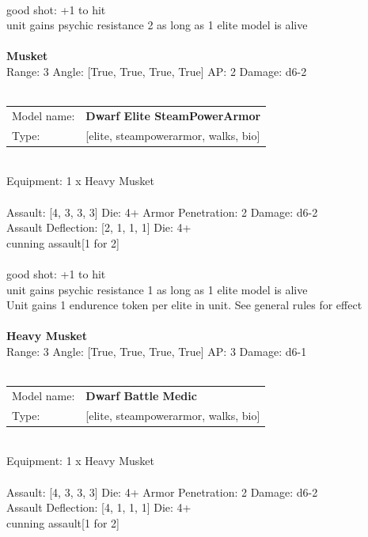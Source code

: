 \ \\
good shot: +1 to hit\\ 
unit gains psychic resistance 2 as long as 1 elite model is alive\\ 

\ \\
{\bf Musket } \\



Range: 3  Angle: [True, True, True, True] AP: 2 Damage: d6-2 \\




 
\ \\


\begin{tabular}{ll}
Model name: & {\bf Dwarf Elite SteamPowerArmor } \\
Type: & [elite, steampowerarmor, walks, bio] \\
\end{tabular}
\ \\
Equipment: 1 x Heavy Musket \\
\ \\
Assault: [4, 3, 3, 3] Die: 4+ Armor Penetration: 2 Damage: d6-2 \\
Assault Deflection: [2, 1, 1, 1] Die: 4+\\
\indent cunning assault[1 for 2]\\ 
 
\ \\
good shot: +1 to hit\\ 
unit gains psychic resistance 1 as long as 1 elite model is alive\\ 
Unit gains 1 endurence token per elite in unit. See general rules for effect\\ 

\ \\
{\bf Heavy Musket } \\



Range: 3  Angle: [True, True, True, True] AP: 3 Damage: d6-1 \\




 
\ \\


\begin{tabular}{ll}
Model name: & {\bf Dwarf Battle Medic } \\
Type: & [elite, steampowerarmor, walks, bio] \\
\end{tabular}
\ \\
Equipment: 1 x Heavy Musket \\
\ \\
Assault: [4, 3, 3, 3] Die: 4+ Armor Penetration: 2 Damage: d6-2 \\
Assault Deflection: [4, 1, 1, 1] Die: 4+\\
\indent cunning assault[1 for 2]\\ 
 
